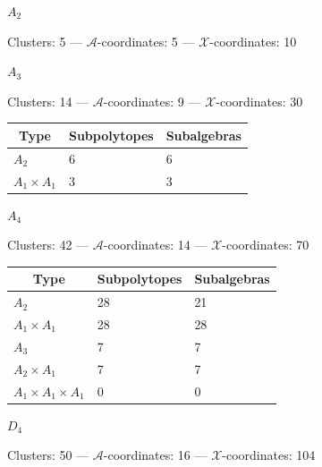 \documentclass[12pt]{article}
\def\xcoords{$\mathcal{X}$-coordinates}
\def\acoords{$\mathcal{A}$-coordinates}
\begin{document}
\enlargethispage{\baselineskip}
\begin{center}
\vspace{.1cm}
{\qquad \qquad \Large{\(A_2\)} \hfill} 

\qquad Clusters: 5 \quad --- \quad  \acoords: 5 \quad --- \quad \xcoords: 10 \hfill

\vspace{.5cm}

{ \qquad \qquad \Large{\(A_3\)} \hfill} 

\vspace{.2cm}
\qquad Clusters: 14 \quad --- \quad \acoords: 9 \quad --- \quad \xcoords: 30 \hfill \\[1em]

\begin{tabular}{ | l | l | l |}
\multicolumn{1}{c}{Type} &  \multicolumn{1}{c}{Subpolytopes}  &  \multicolumn{1}{c}{Subalgebras} \\
\hline \(A_2\) & 6 & 6 \\ 
\hline \(A_1 \times A_1\) & 3 & 3 \\ 
\hline
\end{tabular} 
\vspace{.5cm}

{ \qquad \qquad \Large{\(A_4\)} \hfill}

\vspace{.2cm}
\qquad Clusters: 42 \quad --- \quad \acoords: 14 \quad --- \quad \xcoords: 70 \hfill \\[1em]

\begin{tabular}{ | l | l | l |}
\multicolumn{1}{c}{Type} &  \multicolumn{1}{c}{Subpolytopes}  &  \multicolumn{1}{c}{Subalgebras} \\
\hline \(A_2\) & 28 & 21 \\ 
\hline \(A_1 \times A_1\) & 28 & 28 \\ \hline 
\hline \(A_3\) & 7 & 7 \\ 
\hline \(A_2 \times A_1\) & 7 & 7 \\ 
\hline \(A_1 \times A_1 \times A_1\) & 0 & 0 \\ 
\hline
\end{tabular}
\vspace{.5cm}

{ \qquad \qquad \Large{\(D_4\)} \hfill} 

\vspace{.2cm}
\qquad Clusters: 50 \quad --- \quad \acoords: 16 \quad --- \quad \xcoords: 104 \hfill \\[1em]


\end{center}
\end{document}
